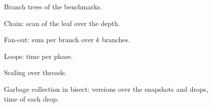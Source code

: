\documentclass[twocolumn,10pt]{article}
\begin{document}
\begin{figure}[p]
\centering
%
\subfloat[chain]{\scalebox{1.3}{\lineagechain}}\hfill
{}\hfill
\subfloat[mcts]{\scalebox{1.3}{\lineagemcts}}\hfill
\subfloat[beam]{\scalebox{1.3}{\lineagebeam}}\hfill
\subfloat[bisect]{\scalebox{1.3}{\lineagebisect}}
\caption{Branch trees of the benchmarks.}
\end{figure}
\clearpage
\begin{figure}[p]\centering\caption{Chain: scan of the leaf over the depth.}\end{figure}
\begin{figure}[p]\centering\caption{Fan-out: sum per branch over $k$ branches.}\end{figure}
\clearpage
\begin{figure}[p]\centering\caption{Loops: time per phase.}\end{figure}
\begin{figure}[p]\centering\caption{Scaling over threads.}\end{figure}
\begin{figure}[p]\centering\caption{Garbage collection in bisect: versions over the snapshots and drops, time of each drop.}\end{figure}
\end{document}
